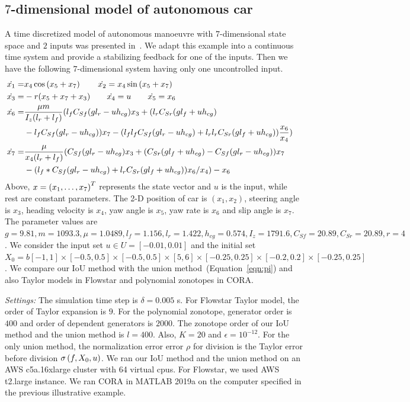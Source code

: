 \subsection{$7$-dimensional model of autonomous car}
A time discretized model of autonomous manoeuvre with $7$-dimensional
state space and $2$ inputs was presented in~\cite{lavaei2020formal}.
We adapt this example into a continuous time system and provide a
stabilizing feedback for one of the inputs.  Then we have the
following $7$-dimensional system having only one
uncontrolled input.
%
\begin{align*}
\dot{x_1}  = & x_4\cos\rb{x_5+x_7}\hspace{2em} \dot{x_2} =
x_4\sin\rb{x_5+x_7}\\
%
\dot{x_3}  = & -r(x_5+x_7+x_3) \hspace{2em} \dot{x_4} =
 u \hspace{2em} \dot{x_5} = x_6 & \\
 \dot{x_6}  = & \frac{\mu
 m}{I_z(l_r+l_f)}(l_fC_{Sf}(gl_r-uh_{cg})x_3+
 (l_rC_{Sr}(gl_f+uh_{cg})\\& -l_fC_{Sf}(gl_r-uh_{cg}))x_7
 -(l_fl_fC_{Sf}(gl_r-uh_{cg}) + l_rl_rC_{Sr}(gl_f+uh_{cg}))\frac{x_6}{x_4})\\
%
\dot{x_7} 
= & \frac{\mu}{x_4(l_r+l_f)}(C_{Sf}(gl_r-uh_{cg})x_3+(C_{Sr}(gl_f+uh_{cg})-C_{Sf}(gl_r-uh_{cg}))x_7\\
&-(l_f*C_{Sf}(gl_r-uh_{cg}) + l_rC_{Sr}(gl_f+uh_{cg}))x_6/x_4)-x_6
\end{align*}
%
Above, $x = \left(x_1,\ldots,x_7\right)^T$ represents the state vector and $u$
is the input, while rest are constant parameters.  The 2-D position of
car is $(x_1,x_2)$, steering angle is $x_3$, heading velocity is
$x_4$, yaw angle is $x_5$, yaw rate is $x_6$ and slip angle is $x_7$.
The parameter values are
%
$ g = 9.81, m = 1093.3, \mu = 1.0489, l_f = 1.156, l_r = 1.422, h_{cg}
  = 0.574, I_z = 1791.6, C_{Sf} = 20.89, C_{Sr} = 20.89, r = 4 $.  We
  consider the input set $u\in U = [-0.01,0.01]$ and the initial set
  $X_0 = b[-1,1]\times[-0.5,0.5]\times[-0.5,0.5]\times[5,6]\times[-0.25,0.25]\times[-0.2,0.2]\times[-0.25,0.25]$.
We compare our IoU method with the union method~(Equation~\ref{eqn:pi}) and
  also Taylor models in Flowstar and polynomial zonotopes in CORA.

\emph{Settings:}  The simulation time step is $\delta = 0.005$ s.  For
  Flowstar Taylor model, the order of Taylor expansion is $9$.  For
  the polynomial zonotope, generator order is $400$ and order of
  dependent generators is $2000$.  The zonotope order of our IoU
  method and the union method is $l=400$.  Also, $K = 20$ and
  $\epsilon = 10^{-12}$.  For the only union method, the normalization error
  error $\rho$ for division is the Taylor error before division
  $\sigma\left(f,X_0,u\right)$.  We ran our IoU method and the union method on
  an AWS c5a.16xlarge cluster with 64 virtual cpus.  For Flowstar, we
  used AWS t2.large instance.  We ran CORA in MATLAB 2019a on the
  computer specified in the previous illustrative example.


